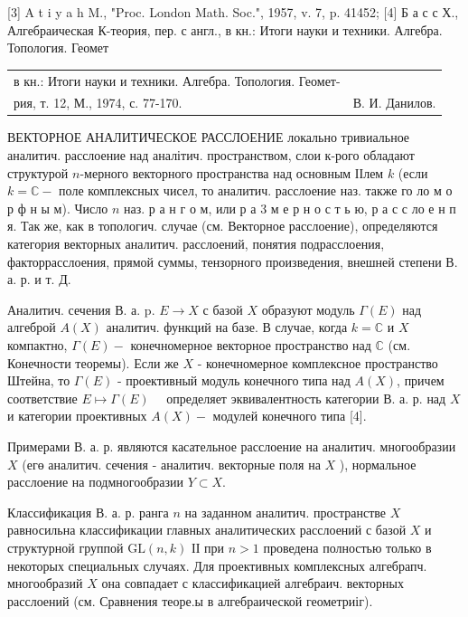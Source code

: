 \documentclass[10pt]{article}
\begin{document}
[3] A t i y a h M., "Proc. London Math. Soc.", 1957, v. 7, p. 41452; [4] Б а с с Х., Алгебраическая К-теория, пер. с англ., в кн.: Итоги науки и техники. Алгебра. Топология. Геомет\begin{tabular}{ll}

в кн.: Итоги науки и техники. Алгебра. Топология. Геомет- &  \\

рия, т. 12, М., 1974, с. 77-170. & В. И. Данилов. \\

\hline

\end{tabular}



ВЕКТОРНОЕ АНАЛИТИЧЕСКОЕ РАССЛОЕНИЕ локально тривиальное аналитич. расслоение над аналітич. пространством, слои к-рого обладают структурой $n$-мерного векторного пространства над основным ІІлем $k$ (если $k=\mathbb{C}-$ поле комплексных чисел, то аналитич. расслоение наз. также го ло м о р ф н ы м). Число $n$ наз. р а н г о м, или р а 3 м е р н о с т ь ю, р а с с ло е н п я. Так же, как в топологич. случае (см. Векторное расслоение), определяются категория векторных аналитич. расслоений, понятия подрасслоения, факторрасслоения, прямой суммы, тензорного произведения, внешней степени В. а. р. и т. Д.



Аналитич. сечения В. а. p. $E \rightarrow X$ с базой $X$ образуют модуль $\Gamma(E)$ над алгеброй $A(X)$ аналитич. функций на базе. В случае, когда $k=\mathbb{C}$ и $X$ компактно, $\Gamma(E)-$ конечномерное векторное пространство над $\mathbb{C}$ (см. Конечности теоремы). Если же $X$ - конечномерное комплексное пространство Штейна, то $\Gamma(E)$ - проективный модуль конечного типа над $A(X)$, причем соответствие $E \mapsto \Gamma(E) \quad$ определяет эквивалентность категории В. а. р. над $X$ и категории проективных $A(X)-$ модулей конечного типа [4].



Примерами В. а. р. являются касательное расслоение на аналитич. многообразии $X$ (егө аналитич. сечения - аналитич. векторные поля на $X$ ), нормальное расслоение на подмногообразии $Y \subset X$.



Классификация В. а. р. ранга $n$ на заданном аналитич. пространстве $X$ равносильна классификации главных аналитических расслоений с базой $X$ и структурной группой $\mathrm{GL}(n, k)$ ІІ при $n>1$ проведена полностью только в некоторых специальных случаях. Для проективных комплексных алгебрапч. многообразий $X$ она совпадает с классификацией алгебраич. векторных расслоений (см. Сравнения теоре.ы в алгебраической геометриіг).
\end{document}
